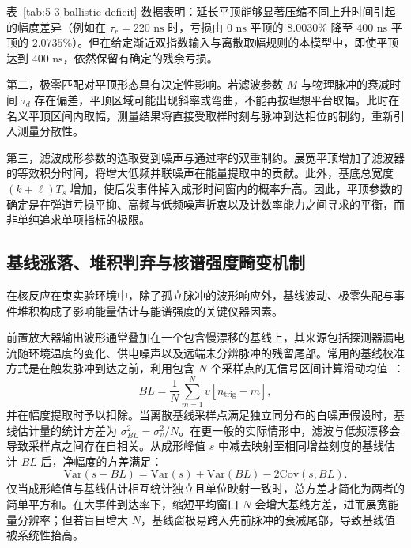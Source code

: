 表~\ref{tab:5-3-ballistic-deficit} 数据表明：延长平顶能够显著压缩不同上升时间引起的幅度差异（例如在 $\tau_r = 220\text{ ns}$ 时，亏损由 $0\text{ ns}$ 平顶的 $8.0030\%$ 降至 $400\text{ ns}$ 平顶的 $2.0735\%$）。但在给定渐近双指数输入与离散取幅规则的本模型中，即使平顶达到 $400\text{ ns}$，依然保留有确定的残余亏损。

第二，极零匹配对平顶形态具有决定性影响。若滤波参数 $M$ 与物理脉冲的衰减时间 $\tau_d$ 存在偏差，平顶区域可能出现斜率或弯曲，不能再按理想平台取幅。此时在名义平顶区间内取幅，测量结果将直接受取样时刻与脉冲到达相位的制约，重新引入测量分散性。

第三，滤波成形参数的选取受到噪声与通过率的双重制约。展宽平顶增加了滤波器的等效积分时间，将增大低频并联噪声在能量提取中的贡献。此外，基底总宽度 $(k + \ell) T_s$ 增加，使后发事件掉入成形时间窗内的概率升高。因此，平顶参数的确定是在弹道亏损平抑、高频与低频噪声折衷以及计数率能力之间寻求的平衡，而非单纯追求单项指标的极限。

\subsection{基线涨落、堆积判弃与核谱强度畸变机制}\label{subsec:5-3-4}

在核反应在束实验环境中，除了孤立脉冲的波形响应外，基线波动、极零失配与事件堆积构成了影响能量估计与能谱强度的关键仪器因素。

前置放大器输出波形通常叠加在一个包含慢漂移的基线上，其来源包括探测器漏电流随环境温度的变化、供电噪声以及远端未分辨脉冲的残留尾部。常用的基线校准方式是在触发脉冲到达之前，利用包含 $N$ 个采样点的无信号区间计算滑动均值~\cite{wu-hongyi-2020-general-purpose-digital-daq-thesis}：
\begin{equation}\label{eq:5-3-bl}
BL = \frac{1}{N} \sum_{m=1}^N v[n_{\text{trig}} - m],
\end{equation}
并在幅度提取时予以扣除。当离散基线采样点满足独立同分布的白噪声假设时，基线估计量的统计方差为 $\sigma_{BL}^2 = \sigma_v^2 / N$。在更一般的实际情形中，滤波与低频漂移会导致采样点之间存在自相关。从成形峰值 $s$ 中减去映射至相同增益刻度的基线估计 $BL$ 后，净幅度的方差满足：
\begin{equation}\label{eq:5-3-var-net}
\mathrm{Var}(s - BL) = \mathrm{Var}(s) + \mathrm{Var}(BL) - 2\mathrm{Cov}(s, BL).
\end{equation}
仅当成形峰值与基线估计相互统计独立且单位映射一致时，总方差才简化为两者的简单平方和。在大事件到达率下，缩短平均窗口 $N$ 会增大基线方差，进而展宽能量分辨率；但若盲目增大 $N$，基线窗极易跨入先前脉冲的衰减尾部，导致基线值被系统性抬高。

